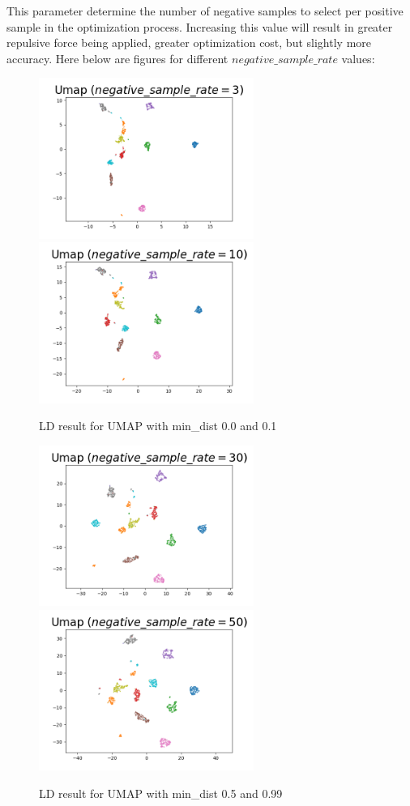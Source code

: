 This parameter determine the number of negative samples to select per positive sample in the optimization process. Increasing this value will result in greater repulsive force being applied, greater optimization cost, but slightly more accuracy. Here below are figures for different $negative\_sample\_rate$ values:

\begin{figure}[H]
\centering  %
{
\label{Fig.sub.1}
\includegraphics[width=7cm,height=3.5cm\textwidth]{images/umap/umap_neg_3.png}}
{
\label{Fig.sub.2}
\includegraphics[width=7cm,height=3.5cm\textwidth]{images/umap/umap_neg_10.png}}
\caption{LD result for UMAP with min\_dist 0.0 and 0.1}
\end{figure}

\begin{figure}[H]
\centering  %
{
\label{Fig.sub.1}
\includegraphics[width=7cm,height=3.5cm\textwidth]{images/umap/umap_neg_30.png}}
{
\label{Fig.sub.2}
\includegraphics[width=7cm,height=3.5cm\textwidth]{images/umap/umap_neg_50.png}}
\caption{LD result for UMAP with min\_dist 0.5 and 0.99}
\end{figure}

